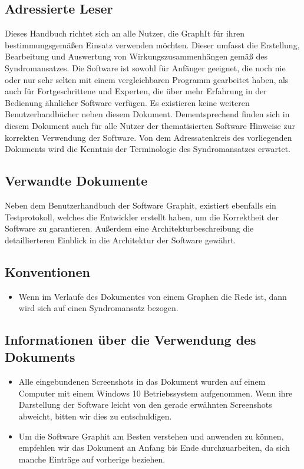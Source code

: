 \documentclass[enabledeprecatedfontcommands,fontsize=11pt,paper=a4,twoside]{scrartcl}
\newcounter{one}
\begin{document}
	\subsection{Adressierte Leser}
	Dieses Handbuch richtet sich an alle Nutzer, die GraphIt für ihren bestimmungsgemäßen Einsatz verwenden möchten. Dieser umfasst die Erstellung, Bearbeitung und Auswertung von Wirkungszusammenhängen gemäß des Syndromansatzes. Die Software ist sowohl für Anfänger geeignet, die noch nie oder nur sehr selten mit einem vergleichbaren Programm gearbeitet haben, als auch für Fortgeschrittene und Experten, die über mehr Erfahrung in der Bedienung ähnlicher Software verfügen. Es existieren keine weiteren Benutzerhandbücher neben diesem Dokument. Dementsprechend finden sich in diesem Dokument auch für alle Nutzer der thematisierten Software Hinweise zur korrekten Verwendung der Software. Von dem Adressatenkreis des vorliegenden Dokuments wird die Kenntnis der Terminologie des Syndromansatzes erwartet.  
	\subsection{Verwandte Dokumente}
	Neben dem Benutzerhandbuch der Software Graphit, existiert ebenfalls ein Testprotokoll, welches die Entwickler erstellt haben, um die Korrektheit der Software zu garantieren. Außerdem eine Architekturbeschreibung die detaillierteren Einblick in die Architektur der Software gewährt. 
	\subsection{Konventionen}
		\begin{itemize}
			\item Wenn im Verlaufe des Dokumentes von einem Graphen die Rede ist, dann wird sich auf einen Syndromansatz bezogen.
		\end{itemize}
	
	\subsection{Informationen über die Verwendung des Dokuments}

		\begin{itemize}
			\item Alle eingebundenen Screenshots in das Dokument wurden auf einem Computer mit einem Windows 10 Betriebssystem aufgenommen. Wenn ihre Darstellung der Software leicht von den gerade erwähnten Screenshots abweicht, bitten wir dies zu entschuldigen.
			\item Um die Software Graphit am Besten verstehen und anwenden zu können, empfehlen wir das Dokument an Anfang bis Ende durchzuarbeiten, da sich manche Einträge auf vorherige beziehen. 
		\end{itemize}
\end{document}

